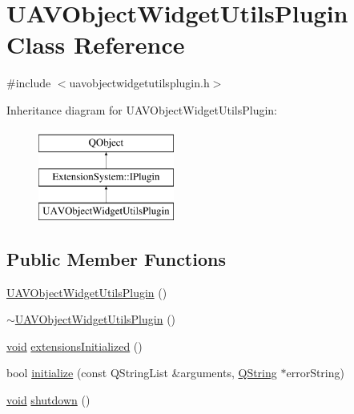 \hypertarget{class_u_a_v_object_widget_utils_plugin}{\section{U\-A\-V\-Object\-Widget\-Utils\-Plugin Class Reference}
\label{class_u_a_v_object_widget_utils_plugin}
}


{\ttfamily \#include $<$uavobjectwidgetutilsplugin.\-h$>$}

Inheritance diagram for U\-A\-V\-Object\-Widget\-Utils\-Plugin\-:\begin{figure}[H]
\begin{center}
\leavevmode
\includegraphics[height=3.000000cm]{class_u_a_v_object_widget_utils_plugin}
\end{center}
\end{figure}
\subsection*{Public Member Functions}
\begin{DoxyCompactItemize}
\item 
\hyperlink{group___u_a_v_object_widget_utils_ga71c193fdd4f73fd349dbb72db72a1d05}{U\-A\-V\-Object\-Widget\-Utils\-Plugin} ()
\item 
\hyperlink{group___u_a_v_object_widget_utils_ga2c7561526e629a5fcaa9bf2def2a4b8c}{$\sim$\-U\-A\-V\-Object\-Widget\-Utils\-Plugin} ()
\item 
\hyperlink{group___u_a_v_objects_plugin_ga444cf2ff3f0ecbe028adce838d373f5c}{void} \hyperlink{group___u_a_v_object_widget_utils_ga8538f7844616deeef2455da33bc8a9fe}{extensions\-Initialized} ()
\item 
bool \hyperlink{group___u_a_v_object_widget_utils_ga7a913580e5284f9291cab68f3bfed4a3}{initialize} (const Q\-String\-List \&arguments, \hyperlink{group___u_a_v_objects_plugin_gab9d252f49c333c94a72f97ce3105a32d}{Q\-String} $\ast$error\-String)
\item 
\hyperlink{group___u_a_v_objects_plugin_ga444cf2ff3f0ecbe028adce838d373f5c}{void} \hyperlink{group___u_a_v_object_widget_utils_ga672bbb620f7be71610e6adc36d5ca0b9}{shutdown} ()
\end{DoxyCompactItemize}


